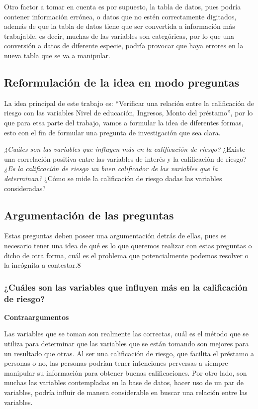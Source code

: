 \documentclass[
  letterpaper,
  DIV=11,
  numbers=noendperiod]{scrreprt}
\begin{document}
Otro factor a tomar en cuenta es por supuesto, la tabla de datos, pues
podría contener información errónea, o datos que no estén correctamente
digitados, además de que la tabla de datos tiene que ser convertida a
información más trabajable, es decir, muchas de las variables son
categóricas, por lo que una conversión a datos de diferente especie,
podría provocar que haya errores en la nueva tabla que se va a
manipular.

\subsection{Reformulación de la idea en modo
preguntas}\label{reformulaciuxf3n-de-la-idea-en-modo-preguntas}

La idea principal de este trabajo es: ``Verificar una relación entre la
calificación de riesgo con las variables Nivel de educación, Ingresos,
Monto del préstamo'', por lo que para etsa parte del trabajo, vamos a
formular la idea de diferentes formas, esto con el fin de formular una
pregunta de investigación que sea clara.

\emph{¿Cuáles son las variables que influyen más en la calificación de
riesgo? }¿Existe una correlación positiva entre las variables de interés
y la calificación de riesgo? \emph{¿Es la calificación de riesgo un buen
calificador de las variables que la determinan? }¿Cómo se mide la
calificación de riesgo dadas las variables consideradas?

\subsection{Argumentación de las
preguntas}\label{argumentaciuxf3n-de-las-preguntas}

Estas preguntas deben poseer una argumentación detrás de ellas, pues es
necesario tener una idea de qué es lo que queremos realizar con estas
preguntas o dicho de otra forma, cuál es el problema que potencialmente
podemos resolver o la incógnita a contestar.8

\subsubsection{¿Cuáles son las variables que influyen más en la
calificación de
riesgo?}\label{cuuxe1les-son-las-variables-que-influyen-muxe1s-en-la-calificaciuxf3n-de-riesgo}

\textbf{Contraargumentos}

Las variables que se toman son realmente las correctas, cuál es el
método que se utiliza para determinar que las variables que se están
tomando son mejores para un resultado que otras. Al ser una calificación
de riesgo, que facilita el préstamo a personas o no, las personas
podrían tener intenciones perversas a siempre manipular su información
para obtener buenas calificaciones. Por otro lado, son muchas las
variables contempladas en la base de datos, hacer uso de un par de
variables, podría influir de manera considerable en buscar una relación
entre las variables.
\end{document}
